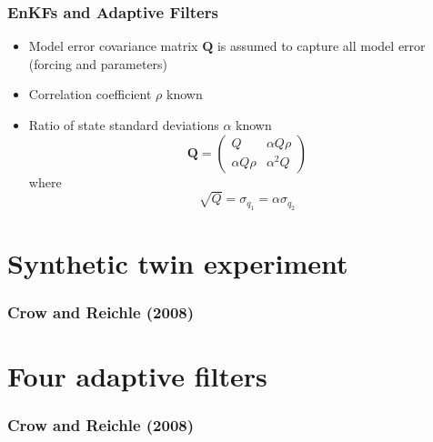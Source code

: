 \documentclass[mathserif]{beamer}
\begin{document}
\begin{frame}
  \frametitle{EnKFs and Adaptive Filters}
  \begin{itemize}
    \item Model error covariance matrix $\mathbf{Q}$ is assumed to capture all model error (forcing and parameters)
    \item Correlation coefficient $\rho$ known
    \item Ratio of state standard deviations $\alpha$ known
      \begin{equation}
        \mathbf{Q}=\begin{pmatrix}
          Q & \alpha Q \rho \\
          \alpha Q \rho & \alpha^2 Q
        \end{pmatrix}
      \end{equation}
      where
      \begin{equation}
        \sqrt{Q} = \sigma_{q_1} = \alpha\sigma_{q_2}
      \end{equation}
  \end{itemize}
\end{frame}

\section{Synthetic twin experiment}

\begin{frame}
  \frametitle{Crow and Reichle (2008)}
  \tableofcontents[currentsection]
\end{frame}

\section{Four adaptive filters}

\begin{frame}
  \frametitle{Crow and Reichle (2008)}
  \tableofcontents[currentsection]
\end{frame}



\end{document}
